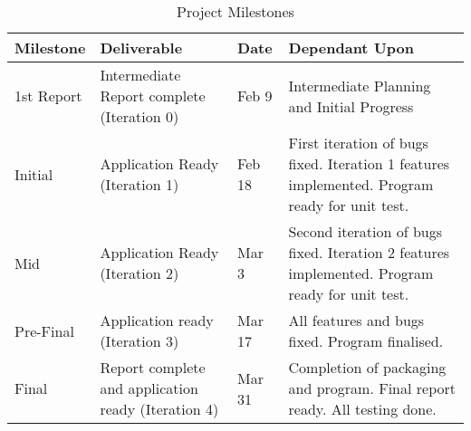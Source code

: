 \documentclass[11pt]{article}
\begin{document}
 	\begin{table}[ht]
		\caption{Project Milestones} %
		\centering %
		\begin{tabular}{p{2cm}|p{4cm}|p{2cm}|p{4cm}} %
		\hline\hline %
		Milestone & Deliverable & Date & Dependant Upon \\ [0.5ex] %
		\hline
		
		1st Report & Intermediate Report complete (Iteration 0) & Feb 9 & Intermediate Planning and Initial Progress\\[1ex]
		
		Initial & Application Ready (Iteration 1) & Feb 18 & First iteration of bugs fixed. Iteration 1 features implemented. Program ready for unit test.  \\ [1ex]
		
		Mid & Application Ready (Iteration 2) & Mar 3 &  Second iteration of bugs fixed. Iteration 2 features implemented. Program ready for unit test.\\ [1ex]
		
		Pre-Final & Application ready (Iteration 3) & Mar 17 & All features and bugs fixed. Program finalised. \\[1ex]
		
		Final & Report complete and application ready (Iteration 4)  & Mar 31 & Completion of packaging and program. Final report ready. All testing done. \\[1ex] %
		\hline
		\end{tabular}
		\label{table:milestones} %
	\end{table}
\end{document}
